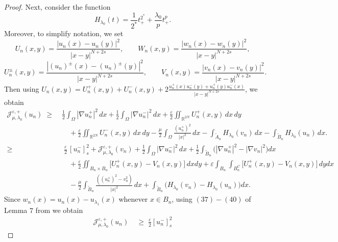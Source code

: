 \documentclass[11pt]{article}
\newcommand{\grad}{\nabla}
\newcommand{\Jepo}{\mathcal{J}_{\mu, \lambda_0}^{\varepsilon,+}}
\begin{document}
\begin{proof}
Next, consider the function
\begin{equation*}
H_{\lambda_0}(t) = \frac{1}{2^*} t^{2^*}_+ + \frac{\lambda_0}{p} t^p_+.
\end{equation*}
Moreover, to simplify notation, we set
\begin{equation*}
U_n(x,y) = \frac{|u_n(x) - u_n(y)|^2}{|x-y|^{N+2s}},
\qquad
W_n(x,y) = \frac{|w_n(x) - w_n(y)|^2}{|x-y|^{N+2s}},
\end{equation*}
\begin{equation*}
U_n^{\pm}(x,y) = \frac{|(u_n)^\pm(x) - (u_n)^\pm(y)|^2}{|x-y|^{N+2s}},
\qquad V_n(x,y) = \frac{|v_n(x) - v_n(y)|^2}{|x-y|^{N+2s}}.
\end{equation*}
Then using $U_n(x,y) = U_n^+(x,y) + U_n^-(x,y) + 2 \frac{u_n^+(x) u_n^-(y)+ u_n^+(y) u_n^-(x)}{|x-y|^{N+2s}}$, we obtain
\begin{equation*}
\begin{aligned}
\Jepo(u_n) \;\geq\; & 
\frac{1}{2} \int_{\Omega} |\grad u_n^+|^2 \, dx 
+ \frac{1}{2} \int_{\Omega} |\nabla u_n^-|^2 \, dx
+ \frac{\varepsilon}{2} \iint_{\mathbb{R}^{2N}} U_n^{+}(x,y) \, dx \, dy  \\
& \quad + \frac{\varepsilon}{2} \iint_{\mathbb{R}^{2N}} U_n^-(x,y) \, dx \, dy
- \frac{\mu}{2} \int_{\Omega} \frac{(u_n^+)^2}{|x|^2} \, dx
- \int_{\widetilde{A}_n} H_{\lambda_0}(v_n) \, dx
- \int_{\widetilde{B}_n} H_{\lambda_0}(u_n) \, dx.\\
\geq&\; \frac{\varepsilon}{2}\,[u_n^- ]_{s}^2 
+ \Jepo(v_n) 
+ \frac{1}{2}\int_{\Omega} |\nabla u_n^-|^2 \, dx 
+ \frac{1}{2}\int_{\widetilde{B}_n} \big(|\nabla u_n^+|^2 - |\nabla v_n|^2\big) dx \\
&\quad + \frac{\varepsilon}{2} \iint_{B_n \times B_n} 
 \big[U_n^+(x,y)-V_n(x,y)\big] \, dx dy +  \varepsilon\int_{B_n} \int_{B_n^C} 
\big[U_n^+(x,y)-V_n(x,y)\big]  \, dy dx \\
&\quad - \frac{\mu}{2} \int_{\widetilde{B}_n} \frac{((u_n^+)^2 - v_n^2)}{|x|^2} \, dx
+ \int_{\widetilde{B}_n} \big( H_{\lambda_0}(v_n) - H_{\lambda_0}(u_n) \big) dx .
\end{aligned}
\end{equation*}
Since $w_n(x) = u_n(x) - u_{\lambda_1}(x)$ whenever $x \in B_n$, using $(37)-(40)$ of Lemma $7$ from \cite{shen_multiplicity_fractional} we obtain
\begin{equation*}
\begin{aligned}
\Jepo(u_n) 
&\;\geq\; \frac{\varepsilon}{2}[u_n^-]_s^2 

\end{aligned}
\end{equation*}
\end{proof}
\end{document}
